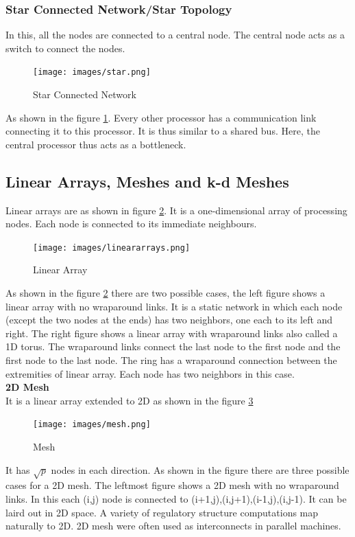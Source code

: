 \documentclass[12pt]{book}
\begin{document}
\subsubsection{Star Connected Network/Star Topology}
In this, all the nodes are connected to a central node. The central node acts as a switch to connect the nodes.
\begin{figure}[H]
    \centering
    \texttt{[image: images/star.png]}
    \caption{Star Connected Network}
    \label{fig:star}
\end{figure}
As shown in the figure \ref{fig:star}. Every other processor has a communication link connecting it to this processor. It is thus similar to 
a shared bus. Here, the central processor thus acts as a bottleneck.

\subsection{Linear Arrays, Meshes and k-d Meshes}
Linear arrays are as shown in figure \ref{fig:linear}. It is a one-dimensional array of processing nodes. Each node is connected to its immediate neighbours.
\begin{figure}[H]
    \centering
    \texttt{[image: images/lineararrays.png]}
    \caption{Linear Array}
    \label{fig:linear}
\end{figure}
As shown in the figure \ref{fig:linear} there are two possible cases, the left figure shows a linear array with no wraparound links. It is a 
static network in which each node (except the two nodes at the ends) has two neighbors, one each to its left and right.
The right figure shows a linear array with wraparound links also called a 1D torus. The wraparound links connect the last node to the first node and the first node to the last node.
The ring has a wraparound connection between the extremities of linear array. Each node has two neighbors in this case.\\
\textbf{2D Mesh}\\
It is a linear array extended to 2D as shown in the figure \ref{fig:2dmesh}
\begin{figure}[H]
    \centering
    \texttt{[image: images/mesh.png]}
    \caption{Mesh}
    \label{fig:2dmesh}
\end{figure}
It has $\sqrt{p}$ nodes in each direction. As shown in the figure there are three possible cases for a 2D mesh.
The leftmost figure shows a 2D mesh with no wraparound links. In this each (i,j) node is connected to (i+1,j),(i,j+1),(i-1,j),(i,j-1).
It can be laird out in 2D space. A variety of regulatory structure computations map naturally to 2D. 2D mesh were often used as interconnects in parallel machines.\\
\end{document}
